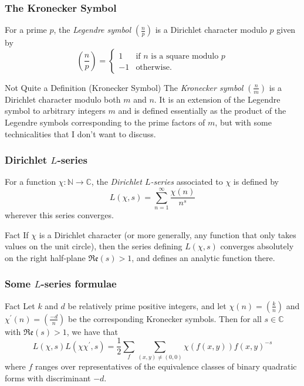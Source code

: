 \documentclass{beamer}
\newcommand{\legendre}[2]{\ensuremath{\left(\frac{#1}{#2}\right)}}
\begin{document}
\begin{frame}
	
	\frametitle{The Kronecker Symbol}

	\begin{definition}
		For a prime $p$, the \emph{Legendre symbol} $\legendre{n}{p}$ is a Dirichlet character modulo $p$ given by
		\[
			\legendre{n}{p} = \begin{cases} 1 & \text{if $n$ is a square modulo $p$} \\ -1 & \text{otherwise.} \end{cases}
		\]
	\end{definition}
	\pause

	\begin{block}{Not Quite a Definition (Kronecker Symbol)}
		The \emph{Kronecker symbol} $\legendre{n}{m}$ is a Dirichlet character modulo both $m$ and $n$. It is an extension of the Legendre symbol to arbitrary integers $m$  and is defined essentially as the product of the Legendre symbols corresponding to the prime factors of $m$, but with some technicalities that I don't want to discuss.
	\end{block}

\end{frame}

\begin{frame}

	\frametitle{Dirichlet $L$-series}

	\begin{definition}[$L$-series]
		For a function $\chi : \mathbb{N} \to \mathbb{C}$, the \emph{Dirichlet $L$-series} associated to $\chi$ is defined by
		\[
			L(\chi, s) = \sum_{n = 1}^{\infty} \frac{\chi(n)}{n^s}
		\]
		wherever this series converges.
	\end{definition}

	\begin{block}{Fact}
		If $\chi$ is a Dirichlet character (or more generally, any function that only takes values on the unit circle), then the series defining $L(\chi, s)$ converges absolutely on the right half-plane $\mathfrak{Re}(s) > 1$, and defines an analytic function there.
	\end{block}
\end{frame}

\begin{frame}

	\frametitle{Some $L$-series formulae}

	\begin{block}{Fact}
		Let $k$ and $d$ be relatively prime positive integers, and let $\chi(n) = \legendre{k}{n}$ and $\chi^\prime(n) = \legendre{-d}{n}$ be the corresponding Kronecker symbols. Then for all $s \in \mathbb{C}$ with $\mathfrak{Re}(s) > 1$, we have that
		\[
			L(\chi, s) L(\chi \chi^\prime, s) = \frac{1}{2} \sum_{f} \sum_{(x, y) \neq (0, 0)} \chi(f(x, y)) {f(x, y)}^{-s}
		\]
		where $f$ ranges over representatives of the equivalence classes of binary quadratic forms with discriminant $-d$.
	\end{block}

\end{frame}
\end{document}
